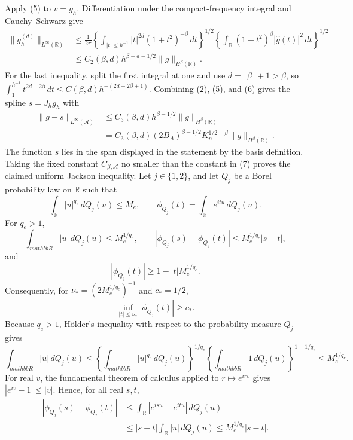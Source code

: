 Apply (5) to \(v=g_h\).  Differentiation under the compact-frequency
integral and Cauchy--Schwarz give
\[
 \begin{aligned}
 \|g_h^{(d)}\|_{L^\infty(\mathbb R)}
 &\le \frac1{2\pi}
 \left\{\int_{|t|\le h^{-1}}|t|^{2d}(1+t^2)^{-\beta}\,dt\right\}^{1/2}
 \left\{\int_{\mathbb R}(1+t^2)^\beta
                    |\widehat g(t)|^2\,dt\right\}^{1/2}\\
 &\le C_2(\beta,d)h^{\beta-d-1/2}
       \|g\|_{H^\beta(\mathbb R)}.                                \tag{6}
 \end{aligned}
\]
For the last inequality, split the first integral at one and use
\(d=\lceil\beta\rceil+1>\beta\), so
\(\int_1^{h^{-1}}t^{2d-2\beta}\,dt
\le C(\beta,d)h^{-(2d-2\beta+1)}\).  Combining (2), (5), and (6) gives
the spline \(s=J_hg_h\) with
\[
 \begin{aligned}
 \|g-s\|_{L^\infty(\mathcal A)}
 &\le C_3(\beta,d)h^{\beta-1/2}\|g\|_{H^\beta(\mathbb R)}\\
 &=C_3(\beta,d)(2B_A)^{\beta-1/2}K_n^{1/2-\beta}
       \|g\|_{H^\beta(\mathbb R)}.                                \tag{7}
 \end{aligned}
\]
The function \(s\) lies in the span displayed in the statement by the basis
definition.  Taking the fixed constant \(C_{\beta,\mathcal A}\) no smaller
than the constant in (7) proves the claimed uniform Jackson inequality.
Let \(j\in\{1,2\}\), and let \(Q_j\) be a Borel probability law on
\(\mathbb R\) such that
\[
 \int_{\mathbb R}|u|^{q_e}\,dQ_j(u)\le M_e,
 \qquad
 \phi_{Q_j}(t)=\int_{\mathbb R}e^{itu}\,dQ_j(u).
\]
For \(q_e>1\),
\[
 \int_{mathbb R}|u|\,dQ_j(u)\le M_e^{1/q_e},
 \qquad
 |\phi_{Q_j}(s)-\phi_{Q_j}(t)|
 \le M_e^{1/q_e}|s-t|,
\]
and
\[
 |\phi_{Q_j}(t)|\ge1-|t|M_e^{1/q_e}.
\]
Consequently, for \(\nu_*=(2M_e^{1/q_e})^{-1}\) and \(c_*=1/2\),
\[
 \inf_{|t|\le\nu_*}|\phi_{Q_j}(t)|\ge c_*.
\]
Because \(q_e>1\), H\"older's inequality with respect to the probability
measure \(Q_j\) gives
\[
 \int_{mathbb R}|u|\,dQ_j(u)
 \le
 \left\{\int_{mathbb R}|u|^{q_e}\,dQ_j(u)\right\}^{1/q_e}
 \left\{\int_{mathbb R}1\,dQ_j(u)\right\}^{1-1/q_e}
 \le M_e^{1/q_e}.                                                   \tag{1}
\]
For real \(v\), the fundamental theorem of calculus applied to
\(r\mapsto e^{irv}\) gives \(|e^{iv}-1|\le|v|\).  Hence, for all real
\(s,t\),
\[
 \begin{aligned}
 |\phi_{Q_j}(s)-\phi_{Q_j}(t)|
 &\le\int_{\mathbb R}|e^{isu}-e^{itu}|\,dQ_j(u)\\
 &\le|s-t|\int_{\mathbb R}|u|\,dQ_j(u)
 \le M_e^{1/q_e}|s-t|.                                             \tag{2}
 \end{aligned}
\]

